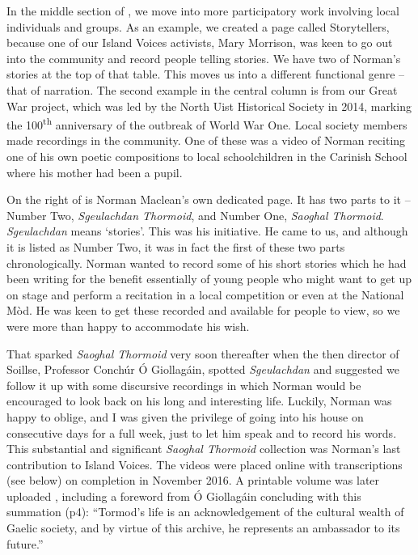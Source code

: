 \documentclass[output=paper,colorlinks,citecolor=brown]{langscibook}
\begin{document}
In the middle section of , we move into more participatory work involving local individuals and groups. As an example, we created a page called Storytellers, because one of our Island Voices activists, Mary Morrison, was keen to go out into the community and record people telling stories. We have two of Norman’s stories at the top of that table. This moves us into a different functional genre – that of narration. The second example in the central column is from our Great War project, which was led by the North Uist Historical Society in 2014, marking the 100\textsuperscript{th} anniversary of the outbreak of World War One. Local society members made recordings in the community. One of these was a video of Norman reciting one of his own poetic compositions to local schoolchildren in the Carinish School where his mother had been a pupil.

On the right of  is Norman Maclean’s own dedicated page. It has two parts to it – Number Two, \textit{Sgeulachdan Thormoid}, and Number One, \textit{Saoghal Thormoid}. \textit{Sgeulachdan} means ‘stories’. This was his initiative. He came to us, and although it is listed as Number Two, it was in fact the first of these two parts chronologically. Norman wanted to record some of his short stories which he had been writing for the benefit essentially of young people who might want to get up on stage and perform a recitation in a local competition or even at the National Mòd. He was keen to get these recorded and available for people to view, so we were more than happy to accommodate his wish.

That sparked \textit{Saoghal Thormoid} very soon thereafter when the then director of Soillse, Professor Conchúr Ó Giollagáin, spotted \textit{Sgeulachdan} and suggested we follow it up with some discursive recordings in which Norman would be encouraged to look back on his long and interesting life. Luckily, Norman was happy to oblige, and I was given the privilege of going into his house on consecutive days for a full week, just to let him speak and to record his words. This substantial and significant \textit{Saoghal Thormoid} collection was Norman’s last contribution to Island Voices. The videos were placed online with  transcriptions (see  below) on completion in November 2016. A printable volume was later uploaded \citep{gw:Wells2017}, including a foreword from Ó Giollagáin concluding with this summation (p4): ``Tormod’s life is an acknowledgement of the cultural wealth of Gaelic society, and by virtue of this archive, he represents an ambassador to its future.”
\end{document}
